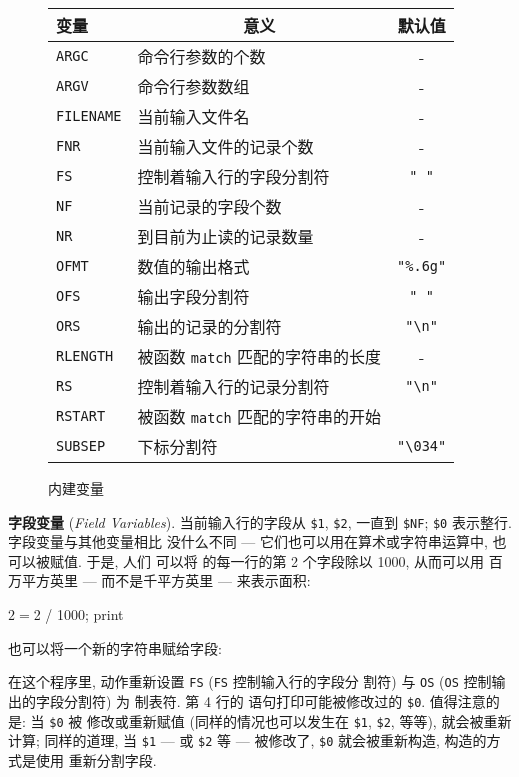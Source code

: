 \begin{figure}[ht]
\captionsetup{type=table}
\caption{内建变量}
\label{tbl:built_in_variables}
\begin{center}
\begin{tabular}{l|l|c}
	\hline
	\hline
	变量	& \multicolumn{1}{c}{意义}	& 默认值 \\
	\hline
	\verb'ARGC'	& 命令行参数的个数	& - \\
	\verb'ARGV'	& 命令行参数数组	& - \\
	\verb'FILENAME'	& 当前输入文件名	& - \\
	\verb'FNR'	& 当前输入文件的记录个数& - \\
	\verb'FS'	& 控制着输入行的字段分割符 & \verb'" "' \\
	\verb'NF'	& 当前记录的字段个数	& - \\
	\verb'NR'	& 到目前为止读的记录数量 & - \\
	\verb'OFMT'	& 数值的输出格式	& \verb'"%.6g"' \\
	\verb'OFS'	& 输出字段分割符	& \verb'" "' \\
	\verb'ORS'	& 输出的记录的分割符	& \verb'"\n"'	\\
	\verb'RLENGTH'	& 被函数 \verb'match' 匹配的字符串的长度 & - \\
	\verb'RS'	& 控制着输入行的记录分割符 & \verb'"\n"'	\\
	\verb'RSTART'	& 被函数 \verb'match' 匹配的字符串的开始 \\
	\verb'SUBSEP'	& 下标分割符	& \verb'"\034"'	\\
	\hline
\end{tabular}
\end{center}
\end{figure}

\textbf{字段变量} (\emph{Field Variables}). 当前输入行的字段从 \verb'$1',
\verb'$2', 一直到 \verb'$NF'; \verb'$0' 表示整行. 字段变量与其他变量相比
没什么不同 --- 它们也可以用在算术或字符串运算中, 也可以被赋值. 于是, 人们
可以将  的每一行的第 2 个字段除以 1000, 从而可以用
百万平方英里 --- 而不是千平方英里 --- 来表示面积:
\begin{awkcode}
    { $2 = $2 / 1000; print }
\end{awkcode}
也可以将一个新的字符串赋给字段:
在这个程序里, \BEGIN 动作重新设置 \verb'FS' (\verb'FS' 控制输入行的字段分
割符) 与 \verb'OS' (\verb'OS' 控制输出的字段分割符) 为 制表符. 第 4 行的
\print 语句打印可能被修改过的 \verb'$0'. 值得注意的是: 当 \verb'$0' 被
修改或重新赋值 (同样的情况也可以发生在 \verb'$1', \verb'$2', 等等), \nf 
就会被重新计算; 同样的道理, 当 \verb'$1' --- 或 \verb'$2' 等 --- 被修改了,
\verb'$0' 就会被重新构造, 构造的方式是使用 \OFS 重新分割字段.

